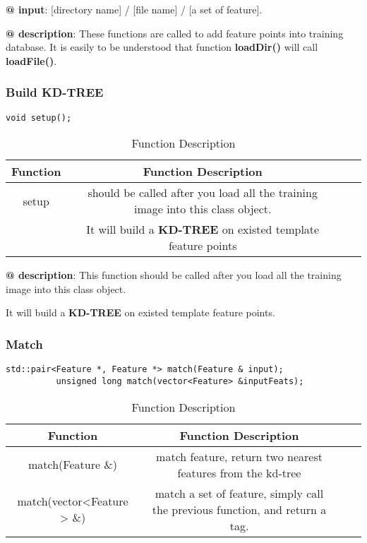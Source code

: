 \documentclass[paper=a4, fontsize=11pt]{scrartcl} %
\numberwithin{equation}{section} %
\numberwithin{figure}{section} %
\numberwithin{table}{section} %
\begin{document}
\textbf{@ input}: [directory name] / [file name] / [a set of feature].

\textbf{@ description}: These functions are called to add feature points into training database. It is easily to be understood that function \textbf{loadDir()} will call \textbf{loadFile()}. 

\subsubsection{Build KD-TREE}
\begin{lstlisting}
void setup();
\end{lstlisting}

\begin{table}[h]
    \centering
    \begin{tabular}{|c|c| lp{}}
        \hline
        \textbf{Function} & \textbf{Function Description} \\\hline
                    setup & should be called after you load all the training image into this class object. \\& It will build a \textbf{KD-TREE} on existed template feature points \\\hline
    \end{tabular}
    \caption{Function Description}\label{nolock}
\end{table}

\textbf{@ description}: This function should be called after you load all the training image into this class object.

It will build a \textbf{KD-TREE} on existed template feature points.

\subsubsection{Match}

\begin{lstlisting}
std::pair<Feature *, Feature *> match(Feature & input);
          unsigned long match(vector<Feature> &inputFeats);
\end{lstlisting}

\begin{table}[h]
    \centering
    \begin{tabular}{|c|c| lp{}}
        \hline
        \textbf{Function} & \textbf{Function Description} \\\hline
            match(Feature \&) & match feature, return two nearest features from the kd-tree\\\hline
            match(vector<Feature > \&) & match a set of feature, simply call the previous function, and return a tag.\\\hline
    \end{tabular}
    \caption{Function Description}\label{nolock}
\end{table}
\end{document}
